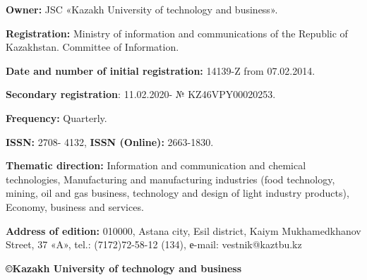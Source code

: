{\bfseries Owner:} JSC «Kazakh University of technology and business».

{\bfseries Registration:} Ministry of information and communications of the
Republic of Kazakhstan. Committee of Information.

{\bfseries Date and number of initial registration:} 14139-Z from
07.02.2014.

{\bfseries Secondary registration}: 11.02.2020- № KZ46VPY00020253.

{\bfseries Frequency:} Quarterly.

{\bfseries ISSN:} 2708- 4132, {\bfseries ISSN (Online):} 2663-1830.

{\bfseries Thematic direction:} Information and communication and chemical
technologies, Manufacturing and manufacturing industries (food
technology, mining, oil and gas business, technology and design of light
industry products), Economy, business and services.

{\bfseries Address of edition:} 010000, Astana city, Esil district, Kaiym
Mukhamedkhanov Street, 37 «A», tel.: (7172)72-58-12 (134),
е-mail: vestnik@kaztbu.kz

\begin{center}
{\bfseries \large ©Kazakh University of technology and business}
\end{center}

\pagebreak
